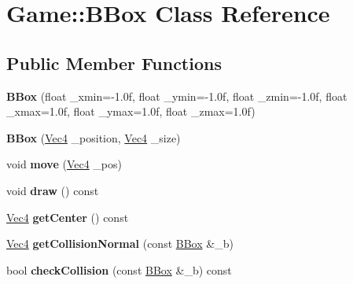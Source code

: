 \hypertarget{classGame_1_1BBox}{\section{Game\-:\-:B\-Box Class Reference}
\label{classGame_1_1BBox}
}
\subsection*{Public Member Functions}
\begin{DoxyCompactItemize}
\item 
\hypertarget{classGame_1_1BBox_a8b78b5bb28c67b0aac135e28400631cd}{{\bfseries B\-Box} (float \-\_\-xmin=-\/1.\-0f, float \-\_\-ymin=-\/1.\-0f, float \-\_\-zmin=-\/1.\-0f, float \-\_\-xmax=1.\-0f, float \-\_\-ymax=1.\-0f, float \-\_\-zmax=1.\-0f)}\label{classGame_1_1BBox_a8b78b5bb28c67b0aac135e28400631cd}

\item 
\hypertarget{classGame_1_1BBox_a7dce5e7dc4ef1e9a3797f2e671becddc}{{\bfseries B\-Box} (\hyperlink{classVec4}{Vec4} \-\_\-position, \hyperlink{classVec4}{Vec4} \-\_\-size)}\label{classGame_1_1BBox_a7dce5e7dc4ef1e9a3797f2e671becddc}

\item 
\hypertarget{classGame_1_1BBox_a5b16bf983217ab3973235e38c7cfdf93}{void {\bfseries move} (\hyperlink{classVec4}{Vec4} \-\_\-pos)}\label{classGame_1_1BBox_a5b16bf983217ab3973235e38c7cfdf93}

\item 
\hypertarget{classGame_1_1BBox_ae1a63c323969c7ae715db00bb722554e}{void {\bfseries draw} () const }\label{classGame_1_1BBox_ae1a63c323969c7ae715db00bb722554e}

\item 
\hypertarget{classGame_1_1BBox_ad0db67f6058be833002c3cc7de35437d}{\hyperlink{classVec4}{Vec4} {\bfseries get\-Center} () const }\label{classGame_1_1BBox_ad0db67f6058be833002c3cc7de35437d}

\item 
\hypertarget{classGame_1_1BBox_a07984f2d08494b5e2e03097992aa5654}{\hyperlink{classVec4}{Vec4} {\bfseries get\-Collision\-Normal} (const \hyperlink{classGame_1_1BBox}{B\-Box} \&\-\_\-b)}\label{classGame_1_1BBox_a07984f2d08494b5e2e03097992aa5654}

\item 
\hypertarget{classGame_1_1BBox_a04d6cea23f3b3f4d8659fd2b3681458f}{bool {\bfseries check\-Collision} (const \hyperlink{classGame_1_1BBox}{B\-Box} \&\-\_\-b) const }\label{classGame_1_1BBox_a04d6cea23f3b3f4d8659fd2b3681458f}

\end{DoxyCompactItemize}
